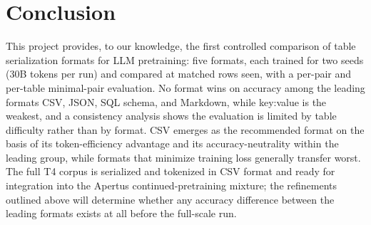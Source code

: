 \documentclass[11pt,a4paper]{article}
\begin{document}
\section{Conclusion}
This project provides, to our knowledge, the first controlled comparison of table serialization formats for LLM pretraining: five formats, each trained for two seeds (30B tokens per run) and compared at matched rows seen, with a per-pair and per-table minimal-pair evaluation. No format wins on accuracy among the leading formats CSV, JSON, SQL schema, and Markdown, while key:value is the weakest, and a consistency analysis shows the evaluation is limited by table difficulty rather than by format. CSV emerges as the recommended format on the basis of its token-efficiency advantage and its accuracy-neutrality within the leading group, while formats that minimize training loss generally transfer worst. The full T4 corpus is serialized and tokenized in CSV format and ready for integration into the Apertus continued-pretraining mixture; the refinements outlined above will determine whether any accuracy difference between the leading formats exists at all before the full-scale run.
\end{document}
